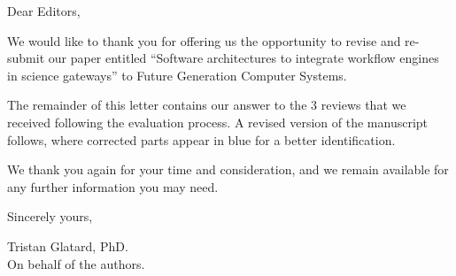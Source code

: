 \documentclass[a4]{letter}
\date{October 16th, 2016}
\begin{document}
\begin{letter}{}

\opening{Dear Editors,}

We would like to thank you for offering us the opportunity to revise
and re-submit our paper entitled ``Software architectures to integrate
workflow engines in science gateways'' to Future Generation Computer
Systems.

The remainder of this letter contains our answer to the 3 reviews that
we received following the evaluation process. A revised version of the
manuscript follows, where corrected parts appear in blue for a better
identification. 

We thank you again for your time and consideration, and we remain available for any further information you may need.

\vspace{0.5cm}

Sincerely yours,

\vspace{1cm}

\closing{Tristan Glatard, PhD.\\On behalf of the authors.}

\end{letter}
\end{document}
